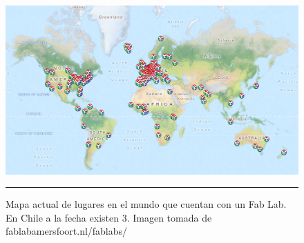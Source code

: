 \begin{figure}[htbp]
	\centering
		\includegraphics[width=\textwidth]{./Figures/map.png}
		\rule{35em}{0.5pt}
	\caption[Mapa Fab Labs en el mundo.]{Mapa actual de lugares en el mundo que cuentan con un Fab Lab. En Chile a la fecha existen 3. Imagen tomada de fablabamersfoort.nl/fablabs/}
	\label{fig:Fablabs}
\end{figure}	




